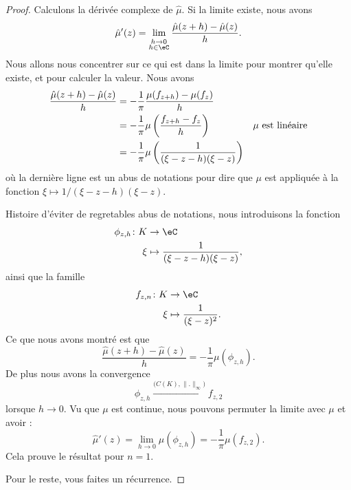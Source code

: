 \begin{proof}
    Calculons la dérivée complexe de \( \hat \mu\). Si la limite existe, nous avons
    \begin{equation}
        \hat \mu'(z)=\lim_{_{\substack{h\to 0\\h\in \eC}}}\frac{ \hat \mu(z+h)-\hat\mu(z) }{ h }. 
    \end{equation}
    Nous allons nous concentrer sur ce qui est dans la limite pour montrer qu'elle existe, et pour calculer la valeur. Nous avons
    \begin{subequations}
        \begin{align}
            \frac{ \hat\mu(z+h)-\hat\mu(z) }{ h }&=-\frac{1}{ \pi }\frac{ \mu(f_{z+h})-\mu(f_z) }{ h }\\
            &=-\frac{1}{ \pi }\mu\left( \frac{ f_{z+h}-f_z }{ h } \right) &\text{\( \mu\) est linéaire}\\
        &=-\frac{1}{ \pi }\mu\left( \frac{ 1 }{ (\xi-z-h)(\xi-z) } \right)
        \end{align}
    \end{subequations}
    où la dernière ligne est un abus de notations pour dire que \( \mu\) est appliquée à la fonction \( \xi\mapsto 1/(\xi-z-h)(\xi-z)\).

    Histoire d'éviter de regretables abus de notations, nous introduisons la fonction
    \begin{equation}
        \begin{aligned}
            \phi_{z,h}\colon K&\to \eC \\
            \xi&\mapsto \frac{1}{ (\xi-z-h)(\xi-z) },
        \end{aligned}
    \end{equation}
    ainsi que la famille
    \begin{equation}
        \begin{aligned}
            f_{z,n}\colon K&\to \eC \\
            \xi&\mapsto \frac{1}{ (\xi-z)^2 }. 
        \end{aligned}
    \end{equation}
    Ce que nous avons montré est que
    \begin{equation}
        \frac{ \hat \mu(z+h)-\hat \mu(z) }{ h }=-\frac{1}{ \pi }\mu(\phi_{z,h}).
    \end{equation}
    De plus nous avons la convergence
    \begin{equation}
        \phi_{z,h}\stackrel{\big( C(K),\| . \|_{\infty} \big)}{\longrightarrow}f_{z,2}
    \end{equation}
    lorsque \( h\to 0\). Vu que \( \mu\) est continue, nous pouvons permuter la limite avec \( \mu\) et avoir :
    \begin{equation}
        \hat\mu'(z)=\lim_{h\to 0} \mu(\phi_{z,h})=-\frac{1}{ \pi }\mu(f_{z,2}).
    \end{equation}
    Cela prouve le résultat pour \( n=1\).

    Pour le reste, vous faites un récurrence.
\end{proof}


